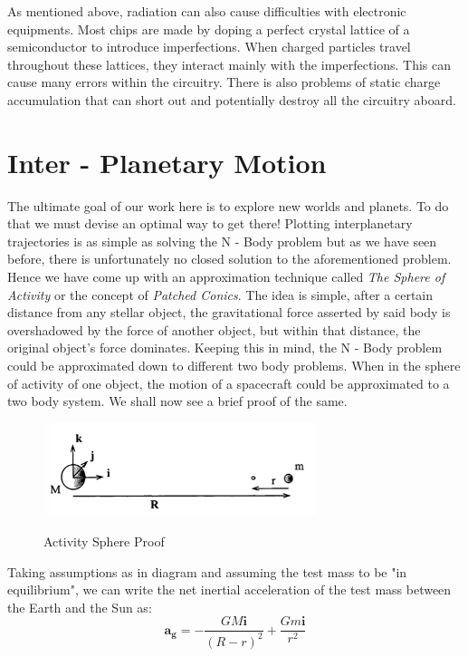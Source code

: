 \documentclass[12pt, letterpaper]{article}
\begin{document}
As mentioned above, radiation can also cause difficulties with electronic equipments. Most chips are made by doping a perfect crystal lattice of a semiconductor to introduce imperfections. When charged particles travel throughout these lattices, they interact mainly with the imperfections. This can cause many errors within the circuitry. There is also problems of static charge accumulation that can short out and potentially destroy all the circuitry aboard.

\newpage
\section{Inter - Planetary Motion}

The ultimate goal of our work here is to explore new worlds and planets. To do that we must devise an optimal way to get there! Plotting interplanetary trajectories is as simple as solving the N - Body problem but as we have seen before, there is unfortunately no closed solution to the aforementioned problem. Hence we have come up with an approximation technique called \textit{The Sphere of Activity} or the concept of \textit{Patched Conics}. The idea is simple, after a certain distance from any stellar object, the gravitational force asserted by said body is overshadowed by the force of another object, but within that distance, the original object's force dominates. Keeping this in mind, the N - Body problem could be approximated down to different two body problems. When in the sphere of activity of one object, the motion of a spacecraft could be approximated to a two body system. We shall now see a brief proof of the same.

\begin{figure}[ht]
	\centering
    \includegraphics[width = 300px]{ASphere}
    \label{fig:ASphere}
    \caption{Activity Sphere Proof}
\end{figure}

Taking assumptions as in diagram and assuming the test mass to be "in equilibrium", we can write the net inertial acceleration of the test mass between the Earth and the Sun as:
\[
	\mathbf{a_g} = -\frac{GM\mathbf{i}}{(R-r)^2} + \frac{Gm\mathbf{i}}{r^2}
\]
\end{document}
